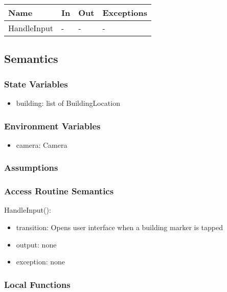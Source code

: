 \documentclass[12pt, titlepage]{article}
\begin{document}
\begin{itemize}
\begin{center}
\begin{tabular}{p{2cm} p{4cm} p{4cm} p{2cm}}
\hline
\textbf{Name} & \textbf{In} & \textbf{Out} & \textbf{Exceptions} \\
\hline
HandleInput & - & - & - \\

\hline
\end{tabular}
\end{center}

\subsection{Semantics}

\subsubsection{State Variables}

\begin{itemize}
\item building: list of BuildingLocation
\end{itemize}

\subsubsection{Environment Variables}
\begin{itemize}
\item camera: Camera
\end{itemize}
  

\subsubsection{Assumptions}

\subsubsection{Access Routine Semantics}

\noindent HandleInput():
\begin{itemize}
\item transition: Opens user interface when a building marker is tapped
\item output: none
\item exception: none
\end{itemize}

\subsubsection{Local Functions}


\end{itemize}
\end{document}
